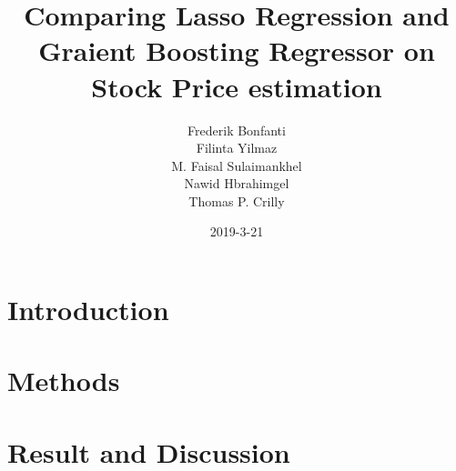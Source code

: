 \documentclass{article}
\title{Comparing Lasso Regression and Graient Boosting Regressor on Stock Price estimation}
\date{2019-3-21}
\author{Frederik Bonfanti \\ Filinta Yilmaz \\ M. Faisal Sulaimankhel \\ Nawid Hbrahimgel \\ Thomas P. Crilly}
\begin{document}
\maketitle

\begin{abstract}
  
\end{abstract}

\section{Introduction}


\section{Methods}


\section{Result and Discussion}


{}

\end{document}
